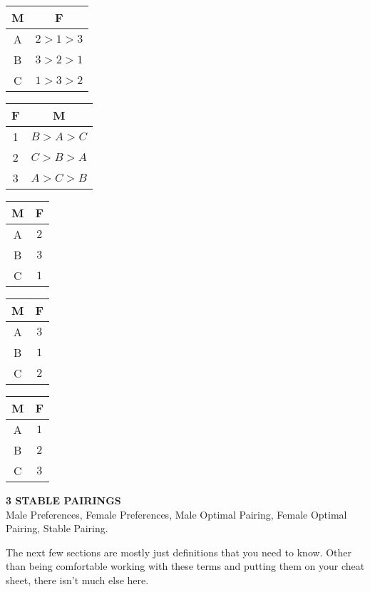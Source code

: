 \documentclass[a4paper]{article}
\begin{document}
\begin{table}[htbp]
    \begin{tabular}[t]{|c|c|}
        \hline
        M & F\\ \hline
        A & $2 > 1 > 3$\\ \hline
        B & $3 > 2 > 1$\\ \hline
        C & $1 > 3 > 2$\\ \hline
    \end{tabular}
    \hfill
    \begin{tabular}[t]{|c|c|}
        \hline
        F & M\\ \hline
        1 & $B > A > C$ \\ \hline
        2 & $C > B > A$\\ \hline  
        3 & $A > C > B$\\ \hline 
    \end{tabular}
    \hfill
    \begin{tabular}[t]{|c|c|}
        \hline
        M & F\\ \hline
        A & $2$\\ \hline
        B & $3$\\ \hline  
        C & $1$\\ \hline 
    \end{tabular}
    \hfill
       \begin{tabular}[t]{|c|c|}
        \hline
        M & F\\ \hline
        A & $3$\\ \hline
        B & $1$\\ \hline  
        C & $2$\\ \hline 
    \end{tabular}
    \hfill
       \begin{tabular}[t]{|c|c|}
        \hline
        M & F\\ \hline
        A & $1$\\ \hline
        B & $2$\\ \hline  
        C & $3$\\ \hline 
    \end{tabular}
    \hfill
\end{table}
\begin{center}
\scriptsize{\textbf{3 STABLE PAIRINGS}}\\
\scriptsize{Male Preferences, Female Preferences, Male Optimal Pairing, Female Optimal Pairing, Stable Pairing.}
\end{center}


\begin{raggedleft}
The next few sections are mostly just definitions that you need to know. Other than being comfortable working with these terms and putting them on your cheat sheet, there isn't much else here.
\end{raggedleft}
\end{document}
